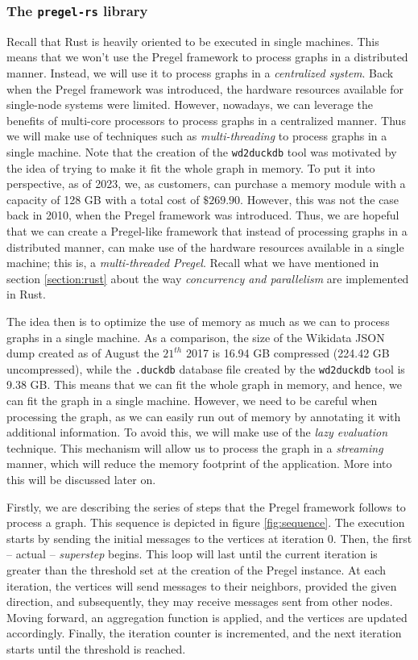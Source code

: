 \label{section:pregel-rs}
\subsubsection{The \texttt{pregel-rs} library}

Recall that Rust is heavily oriented to be executed in single machines. This means that we won't use the Pregel framework to process graphs in a distributed manner. Instead, we will use it to process graphs in a \textit{centralized system}. Back when the Pregel framework was introduced, the hardware resources available for single-node systems were limited. However, nowadays, we can leverage the benefits of multi-core processors to process graphs in a centralized manner. Thus we will make use of techniques such as \textit{multi-threading} to process graphs in a single machine. Note that the creation of the \texttt{wd2duckdb} tool was motivated by the idea of trying to make it fit the whole graph in memory. To put it into perspective, as of 2023, we, as customers, can purchase a memory module with a capacity of 128 GB with a total cost of $\$269.90$. However, this was not the case back in 2010, when the Pregel framework was introduced. Thus, we are hopeful that we can create a Pregel-like framework that instead of processing graphs in a distributed manner, can make use of the hardware resources available in a single machine; this is, a \textit{multi-threaded Pregel}. Recall what we have mentioned in section \ref{section:rust} about the way \textit{concurrency and parallelism} are implemented in Rust.

The idea then is to optimize the use of memory as much as we can to process graphs in a single machine. As a comparison, the size of the Wikidata JSON dump created as of August the $21^{th}$ 2017 is 16.94 GB compressed (224.42 GB uncompressed), while the \texttt{.duckdb} database file created by the \texttt{wd2duckdb} tool is 9.38 GB. This means that we can fit the whole graph in memory, and hence, we can fit the graph in a single machine. However, we need to be careful when processing the graph, as we can easily run out of memory by annotating it with additional information. To avoid this, we will make use of the \textit{lazy evaluation} technique. This mechanism will allow us to process the graph in a \textit{streaming} manner, which will reduce the memory footprint of the application. More into this will be discussed later on.

Firstly, we are describing the series of steps that the Pregel framework follows to process a graph. This sequence is depicted in figure \ref{fig:sequence}. The execution starts by sending the initial messages to the vertices at iteration 0. Then, the first -- actual -- \textit{superstep} begins. This loop will last until the current iteration is greater than the threshold set at the creation of the Pregel instance. At each iteration, the vertices will send messages to their neighbors, provided the given direction, and subsequently, they may receive messages sent from other nodes. Moving forward, an aggregation function is applied, and the vertices are updated accordingly. Finally, the iteration counter is incremented, and the next iteration starts until the threshold is reached.

